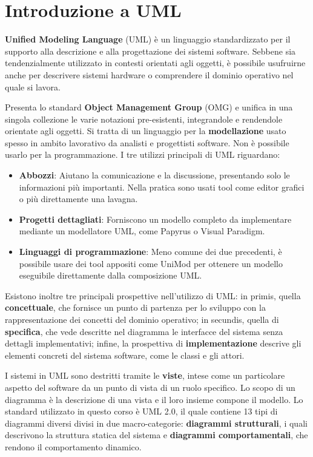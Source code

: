 \section{Introduzione a UML}
\textbf{Unified Modeling Language} (UML) è un linguaggio standardizzato per il supporto alla descrizione e alla progettazione dei sistemi software. Sebbene sia tendenzialmente utilizzato in contesti orientati agli oggetti, è possibile usufruirne anche per descrivere sistemi hardware o comprendere il dominio operativo nel quale si lavora.\par
Presenta lo standard \textbf{Object Management Group} (OMG) e unifica in una singola collezione le varie notazioni pre-esistenti, integrandole e rendendole orientate agli oggetti. Si tratta di un linguaggio per la \textbf{modellazione} usato spesso in ambito lavorativo da analisti e progettisti software. Non è possibile usarlo per la programmazione. I tre utilizzi principali di UML riguardano: \begin{itemize}
	\item \textbf{Abbozzi}: Aiutano la comunicazione e la discussione, presentando solo le informazioni più importanti. Nella pratica sono usati tool come editor grafici o più direttamente una lavagna.
	\item \textbf{Progetti dettagliati}: Forniscono un modello completo da implementare mediante un modellatore UML, come Papyrus o Visual Paradigm.
	\item \textbf{Linguaggi di programmazione}: Meno comune dei due precedenti, è possibile usare dei tool appositi come UniMod per ottenere un modello eseguibile direttamente dalla composizione UML.
\end{itemize}
\noindent Esistono inoltre tre principali prospettive nell'utilizzo di UML: in primis, quella \textbf{concettuale}, che fornisce un punto di partenza per lo sviluppo con la rappresentazione dei concetti del dominio operativo; in secundis, quella di \textbf{specifica}, che vede descritte nel diagramma le interfacce del sistema senza dettagli implementativi; infine, la prospettiva di \textbf{implementazione} descrive gli elementi concreti del sistema software, come le classi e gli attori.\par
I sistemi in UML sono destritti tramite le \textbf{viste}, intese come un particolare aspetto del software da un punto di vista di un ruolo specifico. Lo scopo di un diagramma è la descrizione di una vista e il loro insieme compone il modello. Lo standard utilizzato in questo corso è UML 2.0, il quale contiene 13 tipi di diagrammi diversi divisi in due macro-categorie: \textbf{diagrammi strutturali}, i quali descrivono la struttura statica del sistema e \textbf{diagrammi comportamentali}, che rendono il comportamento dinamico.\par
